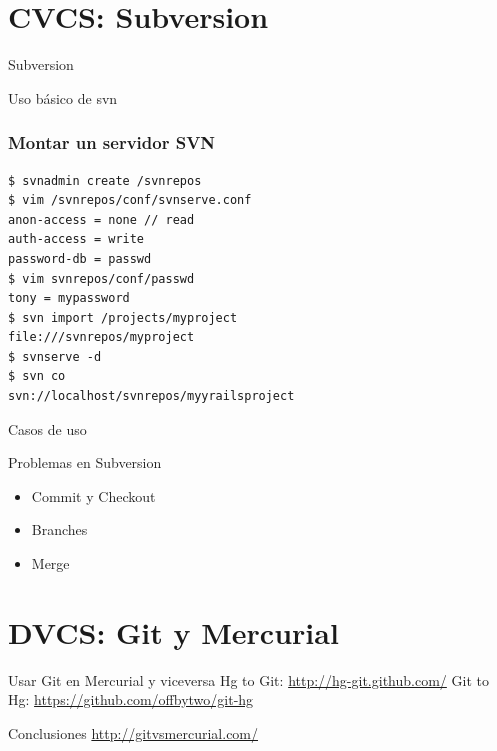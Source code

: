 \documentclass[spanish]{beamer}
\begin{document}
        \section{CVCS: Subversion}
        
       \begin{frame}{Subversion} 
          \end{frame}
       \begin{frame}{Uso básico de svn}
          \end{frame}
\begin{frame}[fragile]
\frametitle{Montar un servidor SVN}
%
\begin{lstlisting}
$ svnadmin create /svnrepos
$ vim /svnrepos/conf/svnserve.conf
anon-access = none // read
auth-access = write
password-db = passwd
$ vim svnrepos/conf/passwd
tony = mypassword
$ svn import /projects/myproject 
file:///svnrepos/myproject
$ svnserve -d
$ svn co 
svn://localhost/svnrepos/myyrailsproject
\end{lstlisting}
\end{frame}
        \begin{frame}{Casos de uso}
         \end{frame}
        \begin{frame}{Problemas en Subversion}
           \begin{itemize}
              \item Commit y Checkout
              \item Branches
              \item Merge
           \end{itemize}
	\end{frame}
        \section{DVCS: Git y Mercurial}

               
        \begin{frame}{Usar Git en Mercurial y viceversa} 
        Hg to Git: \url{http://hg-git.github.com/}
        Git to Hg: \url{https://github.com/offbytwo/git-hg}
        \end{frame}
	\begin{frame}{Conclusiones}
          \url{http://gitvsmercurial.com/}
        \end{frame}
       
\end{document}
